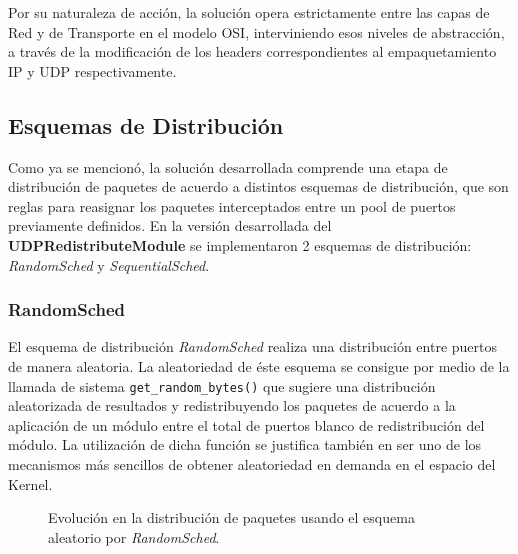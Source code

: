 Por su naturaleza de acción, la solución opera estrictamente entre las capas de Red y de Transporte en el modelo OSI, interviniendo esos niveles de abstracción, a través de la modificación de los headers correspondientes al empaquetamiento IP y UDP respectivamente.

\subsection{Esquemas de Distribución}
Como ya se mencionó, la solución desarrollada comprende una etapa de distribución de paquetes de acuerdo a distintos esquemas de distribución, que son reglas para reasignar los paquetes interceptados entre un pool de puertos previamente definidos. En la versión desarrollada del \textbf{UDPRedistributeModule} se implementaron 2 esquemas de distribución: \emph{RandomSched} y \emph{SequentialSched}.

\subsubsection{RandomSched}
El esquema de distribución \emph{RandomSched} realiza una distribución entre puertos de manera aleatoria. La aleatoriedad de éste esquema se consigue por medio de la llamada de sistema \verb=get_random_bytes()= que sugiere una distribución aleatorizada de resultados y redistribuyendo los paquetes de acuerdo a la aplicación de un módulo entre el total de puertos blanco de redistribución del módulo. La utilización de dicha función se justifica también en ser uno de los mecanismos más sencillos de obtener aleatoriedad en demanda en el espacio del Kernel.

\begin{figure}[th!]
\centering
{}
\caption{Evolución en la distribución de paquetes usando el esquema aleatorio por \emph{RandomSched}.}
\label{fig:RandomSched}
\end{figure}

